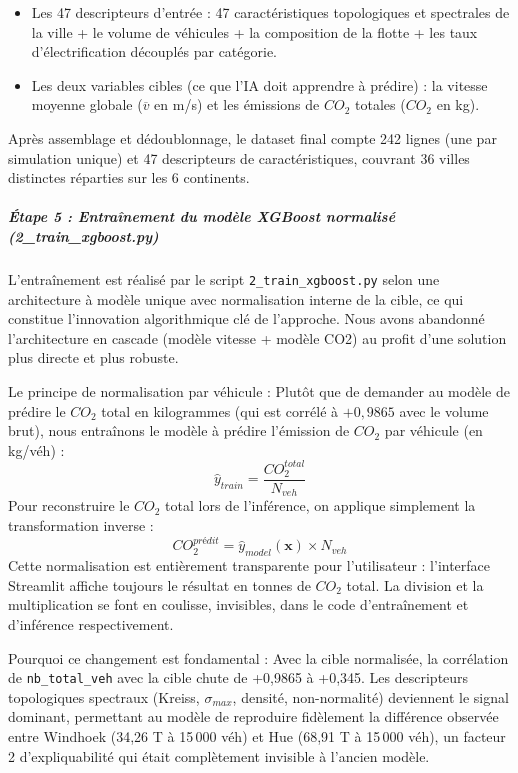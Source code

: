 \documentclass[10pt, a4paper]{article}
\providecommand{\tightlist}{}
\begin{document}
\begin{itemize}
\tightlist
\item
  Les 47 descripteurs d'entrée : 47 caractéristiques topologiques et
  spectrales de la ville + le volume de véhicules + la composition de la
  flotte + les taux d'électrification découplés par catégorie.
\item
  Les deux variables cibles (ce que l'IA doit apprendre à prédire) : la
  vitesse moyenne globale (\(\overline{v}\) en m/s) et les émissions de
  \(CO_2\) totales (\(CO_2\) en kg).
\end{itemize}

Après assemblage et dédoublonnage, le dataset final compte 242 lignes
(une par simulation unique) et 47 descripteurs de caractéristiques,
couvrant 36 villes distinctes réparties sur les 6 continents.

\subparagraph{Étape 5 : Entraînement du modèle XGBoost normalisé
(2\_train\_xgboost.py)}\label{uxe9tape-5-entrauxeenement-du-moduxe8le-xgboost-normalisuxe9-2_train_xgboost.py}

L'entraînement est réalisé par le script \texttt{2\_train\_xgboost.py}
selon une architecture à modèle unique avec normalisation interne de la
cible, ce qui constitue l'innovation algorithmique clé de l'approche.
Nous avons abandonné l'architecture en cascade (modèle vitesse + modèle
CO2) au profit d'une solution plus directe et plus robuste.

Le principe de normalisation par véhicule : Plutôt que de demander au
modèle de prédire le \(CO_2\) total en kilogrammes (qui est corrélé à
\(+0,9865\) avec le volume brut), nous entraînons le modèle à prédire
l'émission de \(CO_2\) par véhicule (en kg/véh) :
\[\hat{y}_{train} = \frac{CO_2^{total}}{N_{veh}}\] Pour reconstruire le
\(CO_2\) total lors de l'inférence, on applique simplement la
transformation inverse :
\[CO_2^{prédit} = \hat{y}_{model}(\mathbf{x}) \times N_{veh}\] Cette
normalisation est entièrement transparente pour l'utilisateur :
l'interface Streamlit affiche toujours le résultat en tonnes de \(CO_2\)
total. La division et la multiplication se font en coulisse, invisibles,
dans le code d'entraînement et d'inférence respectivement.

Pourquoi ce changement est fondamental : Avec la cible normalisée, la
corrélation de \texttt{nb\_total\_veh} avec la cible chute de +0,9865 à
+0,345. Les descripteurs topologiques spectraux (Kreiss,
\(\sigma_{max}\), densité, non-normalité) deviennent le signal dominant,
permettant au modèle de reproduire fidèlement la différence observée
entre Windhoek (34,26 T à 15\,000 véh) et Hue (68,91 T à 15\,000 véh),
un facteur 2 d'expliquabilité qui était complètement invisible à
l'ancien modèle.
\end{document}
